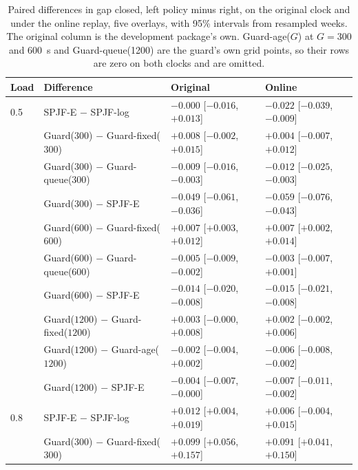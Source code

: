 \documentclass[mathematics,supfile,submit,moreauthors]{Definitions/mdpi}
\newcommand{\devnum}[1]{#1}
\begin{document}
\begin{table}[htbp]
\centering
\small
\caption{Paired differences in gap closed, left policy minus right, on the original clock and
under the online replay, five overlays, with \devnum{95\%} intervals from resampled weeks.
The original column is the development package's own. Guard-age($G$) at $G = 300$ and
600~s and Guard-queue(1200) are the guard's own grid points, so their rows are zero on both
clocks and are omitted.}
\label{tab:s_online_pairs}
\setlength{\tabcolsep}{3pt}
\begin{tabular}{llll}
\toprule
Load & Difference & Original & Online \\
\midrule
\devnum{0.5} & SPJF-E $-$ SPJF-log & \devnum{$-0.000$ [$-0.016$, $+0.013$]} & \devnum{$-0.022$ [$-0.039$, $-0.009$]} \\
 & Guard($\devnum{300}$) $-$ Guard-fixed($\devnum{300}$) & \devnum{$+0.008$ [$-0.002$, $+0.015$]} & \devnum{$+0.004$ [$-0.007$, $+0.012$]} \\
 & Guard($\devnum{300}$) $-$ Guard-queue($\devnum{300}$) & \devnum{$-0.009$ [$-0.016$, $-0.003$]} & \devnum{$-0.012$ [$-0.025$, $-0.003$]} \\
 & Guard($\devnum{300}$) $-$ SPJF-E & \devnum{$-0.049$ [$-0.061$, $-0.036$]} & \devnum{$-0.059$ [$-0.076$, $-0.043$]} \\
 & Guard($\devnum{600}$) $-$ Guard-fixed($\devnum{600}$) & \devnum{$+0.007$ [$+0.003$, $+0.012$]} & \devnum{$+0.007$ [$+0.002$, $+0.014$]} \\
 & Guard($\devnum{600}$) $-$ Guard-queue($\devnum{600}$) & \devnum{$-0.005$ [$-0.009$, $-0.002$]} & \devnum{$-0.003$ [$-0.007$, $+0.001$]} \\
 & Guard($\devnum{600}$) $-$ SPJF-E & \devnum{$-0.014$ [$-0.020$, $-0.008$]} & \devnum{$-0.015$ [$-0.021$, $-0.008$]} \\
 & Guard($\devnum{1200}$) $-$ Guard-fixed($\devnum{1200}$) & \devnum{$+0.003$ [$-0.000$, $+0.008$]} & \devnum{$+0.002$ [$-0.002$, $+0.006$]} \\
 & Guard($\devnum{1200}$) $-$ Guard-age($\devnum{1200}$) & \devnum{$-0.002$ [$-0.004$, $+0.002$]} & \devnum{$-0.006$ [$-0.008$, $-0.002$]} \\
 & Guard($\devnum{1200}$) $-$ SPJF-E & \devnum{$-0.004$ [$-0.007$, $-0.000$]} & \devnum{$-0.007$ [$-0.011$, $-0.002$]} \\
\midrule
\devnum{0.8} & SPJF-E $-$ SPJF-log & \devnum{$+0.012$ [$+0.004$, $+0.019$]} & \devnum{$+0.006$ [$-0.004$, $+0.015$]} \\
 & Guard($\devnum{300}$) $-$ Guard-fixed($\devnum{300}$) & \devnum{$+0.099$ [$+0.056$, $+0.157$]} & \devnum{$+0.091$ [$+0.041$, $+0.150$]} \\

\end{tabular}
\end{table}
\end{document}

